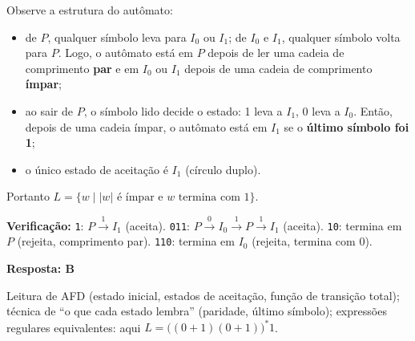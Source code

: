 \documentclass[11pt,a4paper]{article}
\newcommand{\solucao}{\par\medskip\noindent{\large\bfseries\color{verde}Solução}\par\smallskip}
\newcommand{\resposta}[1]{\begin{gabarito}\textbf{Resposta: #1}\end{gabarito}}
\begin{document}
\solucao
Observe a estrutura do autômato:
\begin{itemize}
  \item de $P$, qualquer símbolo leva para $I_0$ ou $I_1$; de $I_0$ e $I_1$, qualquer símbolo volta para $P$.
  Logo, o autômato está em $P$ depois de ler uma cadeia de comprimento \textbf{par} e em $I_0$ ou $I_1$
  depois de uma cadeia de comprimento \textbf{ímpar};
  \item ao sair de $P$, o símbolo lido decide o estado: 1 leva a $I_1$, 0 leva a $I_0$. Então, depois de
  uma cadeia ímpar, o autômato está em $I_1$ se o \textbf{último símbolo foi 1};
  \item o único estado de aceitação é $I_1$ (círculo duplo).
\end{itemize}
Portanto $L = \{w \mid |w| \text{ é ímpar e } w \text{ termina com } 1\}$.

\textbf{Verificação:} \texttt{1}: $P \xrightarrow{1} I_1$ (aceita). \texttt{011}:
$P \xrightarrow{0} I_0 \xrightarrow{1} P \xrightarrow{1} I_1$ (aceita). \texttt{10}: termina em $P$
(rejeita, comprimento par). \texttt{110}: termina em $I_0$ (rejeita, termina com 0).

\resposta{B}

\begin{dica}
Leitura de AFD (estado inicial, estados de aceitação, função de transição total); técnica de
``o que cada estado lembra'' (paridade, último símbolo); expressões regulares equivalentes:
aqui $L = \big((0+1)(0+1)\big)^* 1$.
\end{dica}

\end{document}
